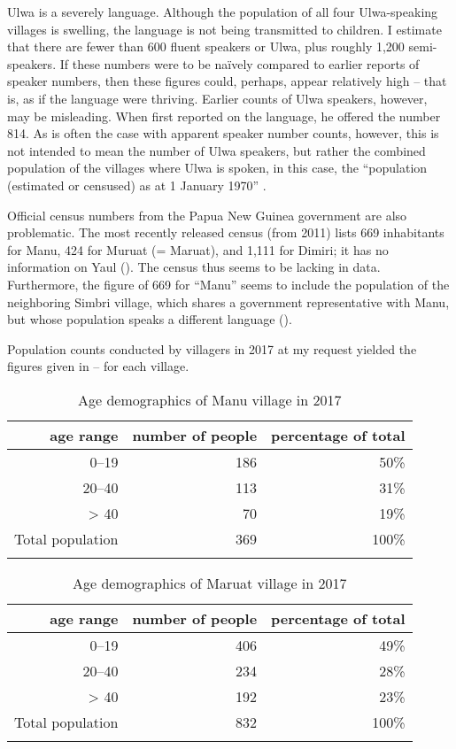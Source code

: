
Ulwa is a severely  language. Although the population of all four Ulwa-speaking villages is swelling, the language is not being transmitted to children. I estimate that there are fewer than 600 fluent speakers or Ulwa, plus roughly 1,200 semi-speakers. If these numbers were to be naïvely compared to earlier reports of speaker numbers, then these figures could, perhaps, appear relatively high -- that is, as if the language were thriving. Earlier counts of Ulwa speakers, however, may be misleading. When \citet[36]{Laycock1973} first reported on the language, he offered the number 814. As is often the case with apparent speaker number counts, however, this is not intended to mean the number of Ulwa speakers, but rather the combined population of the villages where Ulwa is spoken, in this case, the “population (estimated or censused) as at 1 {January 1970}” \citep[3]{Laycock1973}.

Official census numbers from the Papua New Guinea government are also problematic. The most recently released census (from 2011) lists 669 inhabitants for Manu, 424 for Muruat (= Maruat), and 1,111 for Dimiri; it has no information on Yaul (\citealt[31--32]{NationalStatisticOffice2014}). The census thus seems to be lacking in data. Furthermore, the figure of 669 for “Manu” seems to include the population of the neighboring Simbri village, which shares a government representative with Manu, but whose population speaks a different language \mbox{().}

Population counts conducted by villagers in 2017 at my request yielded the figures given in -- for each village.

\begin{table}
\caption{\label{tab:1.8} Age demographics of Manu village in 2017}
\begin{tabular}{rrr}
\lsptoprule
age range & number of people & percentage of total\\
\midrule
0--19 & 186 & 50\%\\
20--40 & 113 & 31\%\\
> 40 & 70 & 19\%\\
\midrule
Total population & 369 & 100\%\\
\lspbottomrule
\end{tabular}
\end{table}

\begin{table}
\caption{\label{tab:1.9} Age demographics of Maruat village in 2017}
\begin{tabular}{rrr}
\lsptoprule
age range & number of people & percentage of total\\
\midrule
0--19 & 406 & 49\%\\
20--40 & 234 & 28\%\\
> 40 & 192 & 23\%\\
\midrule
Total population & 832 & 100\%\\
\lspbottomrule
\end{tabular}
\end{table} \largerpage

